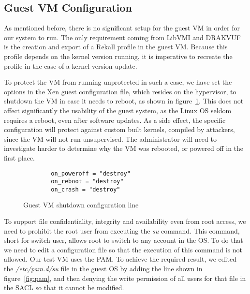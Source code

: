 \subsection{Guest \ac{VM} Configuration}\label{sub:conf}

As mentioned before, there is no significant setup for the guest \ac{VM} in order for our system to run. The only requirement coming from LibVMI and DRAKVUF is the creation and export of a Rekall profile in the guest \ac{VM}. Because this profile depends on the kernel version running, it is imperative to recreate the profile in the case of a kernel version update. 

\par To protect the \ac{VM} from running unprotected in such a case, we have set the options in the Xen guest configuration file, which resides on the hypervisor, to shutdown the \ac{VM} in case it needs to reboot, as shown in figure~\ref{fig:conf}. This does not affect significantly the usability of the guest system, as the Linux \ac{OS} seldom requires a reboot, even after software updates. As a side effect, the specific configuration will protect against custom built kernels, compiled by attackers, since the \ac{VM} will not run unsupervised. The administrator will need to investigate harder to determine why the \ac{VM} was rebooted, or powered off in the first place.

\begin{figure}[ht]
	\centering
	\footnotesize{\selectfont 
	\begin{lstlisting}
		on_poweroff = "destroy"
		on_reboot = "destroy"
		on_crash = "destroy"
	\end{lstlisting}}
	\caption{Guest \ac{VM} shutdown configuration line}
	\label{fig:conf}
\end{figure}

\par To support file confidentiality, integrity and availability even from root access, we need to prohibit the root user from executing the \textit{su} command. This command, short for switch user, allows root to switch to any account in the \ac{OS}. To do that we need to edit a configuration file so that the execution of this command is not allowed. Our test \ac{VM} uses the \ac{PAM}. To achieve the required result, we edited the \textit{/etc/pam.d/su} file in the guest \ac{OS} by adding the line shown in figure~\ref{fig:pam}, and then denying the write permission of all users for that file in the \ac{SACL} so that it cannot be modified.

